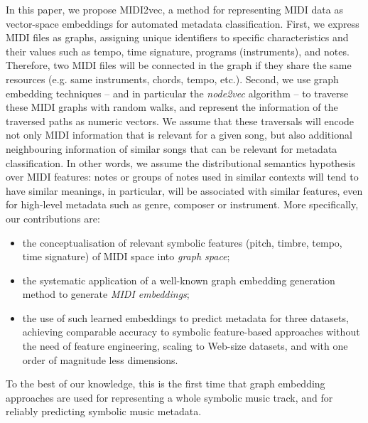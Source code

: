 \documentclass{article}
\begin{document}
In this paper, we propose MIDI2vec, a method for representing MIDI data as vector-space embeddings for automated metadata classification. First, we express MIDI files as graphs, assigning unique identifiers to specific characteristics and their values such as tempo, time signature, programs (instruments), and notes. Therefore, two MIDI files will be connected in the graph if they share the same resources (e.g. same instruments, chords, tempo, etc.). Second, we use graph embedding techniques -- and in particular the \textit{node2vec} algorithm \citep{grover2016node2vec} -- to traverse these MIDI graphs with random walks, and represent the information of the traversed paths as numeric vectors. We assume that these traversals will encode not only MIDI information that is relevant for a given song, but also additional neighbouring information of similar songs that can be relevant for metadata classification.
In other words, we assume the distributional semantics hypothesis ~\citep{harris1954distributional} over MIDI features:
notes or groups of notes used in similar contexts will tend to have similar meanings, in particular, will be associated with similar features, even for high-level metadata such as genre, composer or instrument. More specifically, our contributions are:
\begin{itemize}
    \item the conceptualisation of relevant symbolic features (pitch, timbre, tempo, time signature) of MIDI space into \emph{graph space};
    \item the systematic application of a well-known graph embedding generation method to generate \emph{MIDI embeddings};
    \item the use of such learned embeddings to predict metadata for three datasets, achieving 
    comparable accuracy to symbolic feature-based approaches without the need of feature engineering, scaling to Web-size datasets, and with one order of magnitude less dimensions.
\end{itemize}
To the best of our knowledge, this is the first time that graph embedding approaches are used for representing a whole symbolic music track, and for reliably predicting symbolic music metadata.
\end{document}

